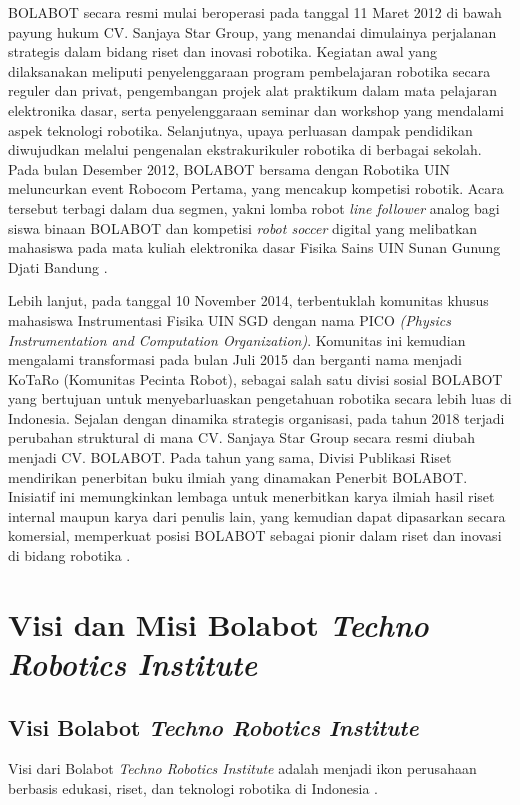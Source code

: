 BOLABOT secara resmi mulai beroperasi pada tanggal 11 Maret 2012 di bawah payung hukum CV. Sanjaya Star Group, yang menandai dimulainya perjalanan strategis dalam bidang riset dan inovasi robotika. Kegiatan awal yang dilaksanakan meliputi penyelenggaraan program pembelajaran robotika secara reguler dan privat, pengembangan projek alat praktikum dalam mata pelajaran elektronika dasar, serta penyelenggaraan seminar dan workshop yang mendalami aspek teknologi robotika. Selanjutnya, upaya perluasan dampak pendidikan diwujudkan melalui pengenalan ekstrakurikuler robotika di berbagai sekolah. Pada bulan Desember 2012, BOLABOT bersama dengan Robotika UIN meluncurkan event Robocom Pertama, yang mencakup kompetisi robotik. Acara tersebut terbagi dalam dua segmen, yakni lomba robot \textit{line follower} analog bagi siswa binaan BOLABOT dan kompetisi \textit{robot soccer} digital yang melibatkan mahasiswa pada mata kuliah elektronika dasar Fisika Sains UIN Sunan Gunung Djati Bandung \cite{15}.

Lebih lanjut, pada tanggal 10 November 2014, terbentuklah komunitas khusus mahasiswa Instrumentasi Fisika UIN SGD dengan nama PICO \textit{(Physics Instrumentation and Computation Organization)}. Komunitas ini kemudian mengalami transformasi pada bulan Juli 2015 dan berganti nama menjadi KoTaRo (Komunitas Pecinta Robot), sebagai salah satu divisi sosial BOLABOT yang bertujuan untuk menyebarluaskan pengetahuan robotika secara lebih luas di Indonesia. Sejalan dengan dinamika strategis organisasi, pada tahun 2018 terjadi perubahan struktural di mana CV. Sanjaya Star Group secara resmi diubah menjadi CV. BOLABOT. Pada tahun yang sama, Divisi Publikasi Riset mendirikan penerbitan buku ilmiah yang dinamakan Penerbit BOLABOT. Inisiatif ini memungkinkan lembaga untuk menerbitkan karya ilmiah hasil riset internal maupun karya dari penulis lain, yang kemudian dapat dipasarkan secara komersial, memperkuat posisi BOLABOT sebagai pionir dalam riset dan inovasi di bidang robotika \cite{15}.

\section{Visi dan Misi Bolabot \textit{Techno Robotics Institute}}

\subsection{Visi Bolabot \textit{Techno Robotics Institute}}
Visi dari Bolabot \textit{Techno Robotics Institute} adalah menjadi ikon perusahaan berbasis edukasi, riset, dan teknologi robotika di Indonesia \cite{15}.

